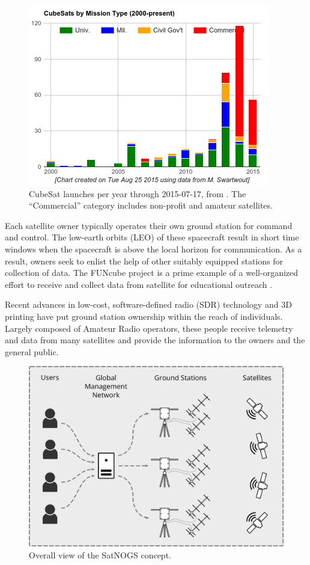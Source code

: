 \documentclass[conference,letterpaper,12pt]{IEEEtran}
\newlength{\imgwidth}
\begin{document}
\begin{figure}[htbp]
\centering
\includegraphics[width=\imgwidth]{fig/cubesat-launches}
\caption{CubeSat launches per year through 2015-07-17, from \cite{SwartwoutDatabase}.  The ``Commercial'' category includes non-profit and amateur satellites.}
\label{f:launches}
\end{figure}

Each satellite owner typically operates their own ground station for command and control.
The low-earth orbits (LEO) of these spacecraft result in short time windows when the spacecraft is above the local horizon for communication.
As a result, owners seek to enlist the help of other suitably equipped stations for collection of data.
The FUNcube project is a prime example of a well-organized effort to receive and collect data from satellite for educational outreach \cite{FUNcube}.

Recent advances in low-cost, software-defined radio (SDR) technology and 3D printing have put ground station ownership within the reach of individuals.
Largely composed of Amateur Radio operators, these people receive telemetry and data from many satellites and provide the information to the owners and the general public.

\begin{figure}[b]
\centering
\includegraphics[width=\imgwidth]{fig/overall-system}
\caption{Overall view of the SatNOGS concept.}
\label{f:overall}
\end{figure}
\end{document}
